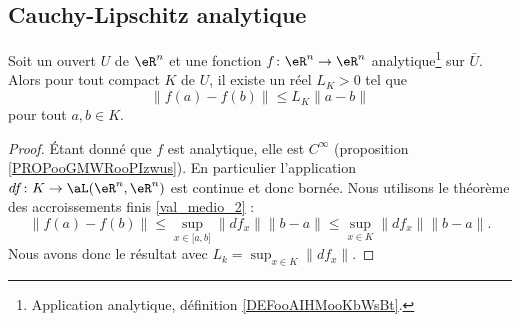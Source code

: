 \subsection{Cauchy-Lipschitz analytique}

\begin{proposition}	\label{PROPooSLVEooFeDlcO}
	Soit un ouvert \( U\) de \( \eR^n\) et une fonction \(f \colon \eR^n\to \eR^n  \) analytique\footnote{Application analytique, définition \ref{DEFooAIHMooKbWsBt}.} sur \( \bar U\). Alors pour tout compact \( K\) de \( U\), il existe un réel \( L_K>0\) tel que
	\begin{equation}
		\| f(a)-f(b) \|\leq L_K\| a-b \|
	\end{equation}
	pour tout \( a,b\in K\).
\end{proposition}

\begin{proof}
	Étant donné que \( f\) est analytique, elle est \( C^{\infty}\) (proposition \ref{PROPooGMWRooPIzwus}). En particulier l'application \(df \colon K\to \aL(\eR^n,\eR^n)  \) est continue et donc bornée. Nous utilisons le théorème des accroissements finis \ref{val_medio_2} :
	\begin{equation}
		\| f(a)-f(b) \|\leq \sup_{x\in \mathopen[ a,b\mathclose]}\| df_x \|\| b-a \|\leq \sup_{x\in K}\| df_x \|\| b-a \|.
	\end{equation}
	Nous avons donc le résultat avec \( L_k=\sup_{x\in K}\| df_x \|\).
\end{proof}


